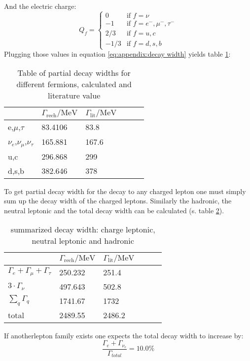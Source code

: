 And the electric charge:
\begin{equation}
Q_f = \begin{cases}
0 & \text{if } f = \nu\\
-1 & \text{if } f = e^-,\mu^-,\tau^-\\
2/3 & \text{if } f = u,c\\
-1/3 & \text{if } f = d,s,b
\end{cases}
\end{equation}
Plugging those values in equation \ref{eq:appendix:decay width} yields table \ref{tb:appendix:decay widths}:

\begin{table}[H]\centering
	\begin{tabular}{@{}llllll@{}}
		\toprule
		 & $\Gamma _{\text{rech}}\text{/MeV}$ & $\Gamma
		 _{\text{lit}}\text{/MeV}$ \\
		 \midrule
		 e,$\mu $,$\tau $ & 83.4106 & 83.8 \\
		 $\nu _e$,$\nu _{\mu }$,$\nu _{\tau }$ & 165.881 & 167.6 \\
		 u,c & 296.868 & 299 \\
		 d,s,b & 382.646 & 378 \\
		 \bottomrule
	\end{tabular}
	\caption[partial decay widths]{Table of partial decay widths for different fermions, calculated and literature value\cite{muenchen}}
	\label{tb:appendix:decay widths}
\end{table}
To get partial decay width for the decay to any charged lepton one must simply sum up the decay width of the charged leptons. Similarly the hadronic, the neutral leptonic and the total decay width can be calculated (s. table \ref{tb:appendix:summarized decay widths}).
\begin{table}[H]\centering
	\begin{tabular}{@{}llllll@{}}
		\toprule
		& $\Gamma _{\text{rech}}\text{/MeV}$ & $\Gamma
		_{\text{lit}}\text{/MeV}$ \\
		\midrule
		$\Gamma_e+\Gamma_{\mu}+\Gamma_{\tau}$ & 250.232 & 251.4 \\
		$3\cdot \Gamma_{\nu}$ & 497.643 & 502.8 \\
		$\sum_q\Gamma_q$ & 1741.67 & 1732 \\
		total & 2489.55 & 2486.2 \\
		\bottomrule
	\end{tabular}
	\caption[summarized decay widths]{summarized decay width: charge leptonic, neutral leptonic and hadronic}
	\label{tb:appendix:summarized decay widths}
\end{table}
If anotherlepton family exists one expects the total decay width to increase by:
\begin{equation}
\frac{\Gamma_e + \Gamma_{\nu_e}}{\Gamma_{total}}=10.0 \%
\end{equation}
